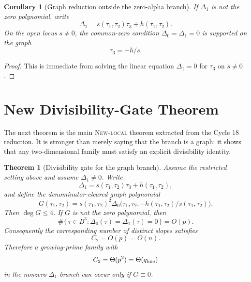 \documentclass[11pt]{article}
\newtheorem{theorem}{Theorem}
\newtheorem{corollary}{Corollary}
\newcommand{\Deltaone}{\Delta_1}
\newcommand{\Deltazero}{\Delta_0}
\newcommand{\tauone}{\tau_1}
\newcommand{\tautwo}{\tau_2}
\newcommand{\tauthree}{\tau_3}
\newcommand{\Ctwo}{C_2}
\newcommand{\qline}{q_{\rm line}}
\begin{document}
\begin{corollary}[Graph reduction outside the zero-alpha branch]
\label{cor:graph}
If \(\Deltaone\) is not the zero polynomial, write
\[
  \Deltaone=s(\tauone,\tautwo)\tauthree+h(\tauone,\tautwo).
\]
On the open locus \(s\ne0\), the common-zero condition
\(\Deltazero=\Deltaone=0\) is supported on the graph
\[
  \tauthree=-h/s.
\]
\end{corollary}

\begin{proof}
This is immediate from solving the linear equation \(\Deltaone=0\) for
\(\tauthree\) on \(s\ne0\).
\end{proof}

\section{New Divisibility-Gate Theorem}
\label{sec:divisibility-gate}

The next theorem is the main \textsc{New-local} theorem extracted from the
Cycle 18 reduction.  It is stronger than merely saying that the branch is a
graph: it shows that any two-dimensional family must satisfy an explicit
divisibility identity.

\begin{theorem}[Divisibility gate for the graph branch]
\label{thm:divisibility-gate}
Assume the restricted setting above and assume \(\Deltaone\ne0\).  Write
\[
  \Deltaone=s(\tauone,\tautwo)\tauthree+h(\tauone,\tautwo),
\]
and define the denominator-cleared graph polynomial
\[
  G(\tauone,\tautwo)
  =s(\tauone,\tautwo)^2
    \Deltazero\bigl(\tauone,\tautwo,-h(\tauone,\tautwo)/s(\tauone,\tautwo)\bigr).
\]
Then \(\deg G\le 4\).  If \(G\) is not the zero polynomial, then
\[
  \#\{\,\tau\in B^3:\Deltazero(\tau)=\Deltaone(\tau)=0\,\}=O(p).
\]
Consequently the corresponding number of distinct slopes satisfies
\[
  \Ctwo=O(p)=O(n).
\]
Therefore a growing-prime family with
\[
  \Ctwo=\Theta(p^2)=\Theta(\qline)
\]
in the nonzero-\(\Deltaone\) branch can occur only if \(G\equiv0\).
\end{theorem}
\end{document}
